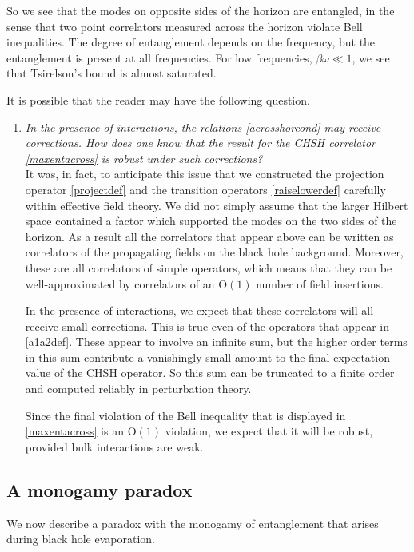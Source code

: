 \documentclass[12pt]{article}
\def\Or[#1]{{\text{O}}\left({#1}\right)}
\begin{document}
So we see that the modes on opposite sides of the horizon are entangled, in the sense that two point correlators measured across the horizon violate Bell inequalities. The degree of entanglement depends on the frequency, but the entanglement is present at all frequencies. For low frequencies, $\beta \omega \ll 1$, we see that Tsirelson's bound is almost saturated.

It is possible that the reader may have the following question.
\begin{enumerate}[qseries]
\item
{\em In the presence of interactions, the relations \eqref{acrosshorcond} may receive corrections. How does one know that the result for the CHSH correlator \eqref{maxentacross} is robust under such corrections?}\\
It was, in fact, to anticipate this issue that we constructed the projection operator \eqref{projectdef} and the transition operators \eqref{raiselowerdef} carefully within effective field theory. We did not simply assume that the larger Hilbert space contained a factor which supported the modes on the two sides of the horizon. As a result all the correlators that appear above can be written as correlators of the propagating fields on the black hole background. Moreover, these are all correlators of simple operators, which means that they can be well-approximated by correlators of an $\Or[1]$ number of field insertions.

In the presence of interactions, we expect that these correlators will all receive small corrections. This is true
even of the operators that appear in \eqref{a1a2def}. These appear to involve an infinite sum, but the higher order terms in this sum contribute a vanishingly small amount to the final expectation value of the CHSH operator. So this sum can be truncated to a finite order and computed reliably in perturbation theory.

Since the final violation of the Bell inequality that is displayed in \eqref{maxentacross} is an $\Or[1]$ violation, we expect that it will be robust, provided bulk interactions are weak. 
\end{enumerate}

\subsection{A monogamy paradox \label{secmonogamy}}

We now describe a paradox with the monogamy of entanglement that arises during black hole evaporation.  
\end{document}
